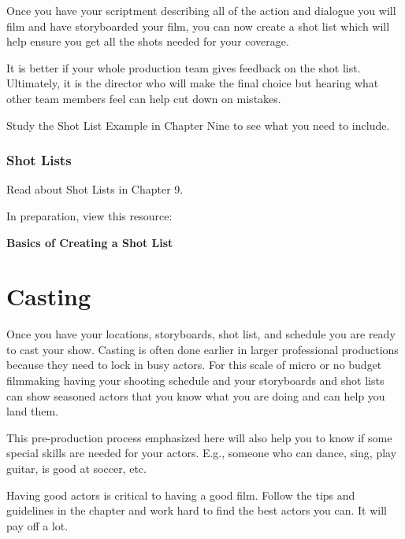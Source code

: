 \documentclass[
]{book}
\begin{document}
Once you have your scriptment describing all of the action and dialogue you will film and have storyboarded your film, you can now create a shot list which will help ensure you get all the shots needed for your coverage.

It is better if your whole production team gives feedback on the shot list. Ultimately, it is the director who will make the final choice but hearing what other team members feel can help cut down on mistakes.

Study the Shot List Example in Chapter Nine to see what you need to include.

\begin{reflect}
\hypertarget{shot-lists-1}{%
\subsubsection*{Shot Lists}\label{shot-lists-1}}

Read about Shot Lists in Chapter 9.

In preparation, view this resource:

\textbf{Basics of Creating a Shot List}
\end{reflect}

\hypertarget{casting}{%
\section*{Casting}\label{casting}}

Once you have your locations, storyboards, shot list, and schedule you are ready to cast your show. Casting is often done earlier in larger professional productions because they need to lock in busy actors. For this scale of micro or no budget filmmaking having your shooting schedule and your storyboards and shot lists can show seasoned actors that you know what you are doing and can help you land them.

This pre-production process emphasized here will also help you to know if some special skills are needed for your actors. E.g., someone who can dance, sing, play guitar, is good at soccer, etc.

Having good actors is critical to having a good film. Follow the tips and guidelines in the chapter and work hard to find the best actors you can. It will pay off a lot.
\end{document}
